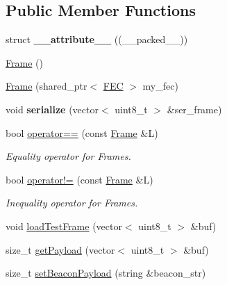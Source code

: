 \subsection*{Public Member Functions}
\begin{DoxyCompactItemize}
\item 
\mbox{\label{classFrame_a1c9286c3bbd1c0393baefa0ee4120a04}} 
struct {\bfseries \+\_\+\+\_\+attribute\+\_\+\+\_\+} ((\+\_\+\+\_\+packed\+\_\+\+\_\+))
\item 
\hyperlink{classFrame_ad2e5946cf41d4817e750500acf05d02b}{Frame} ()
\item 
\hyperlink{classFrame_a230b093686859a8d614b81b19f0433a0}{Frame} (shared\+\_\+ptr$<$ \hyperlink{classFEC}{F\+EC} $>$ my\+\_\+fec)
\item 
\mbox{\label{classFrame_abc897b6f22eabc8d4b2f12821bce1649}} 
void {\bfseries serialize} (vector$<$ uint8\+\_\+t $>$ \&ser\+\_\+frame)
\item 
\mbox{\label{classFrame_a40746b6fa955619e185573c1d38022dd}} 
bool \hyperlink{classFrame_a40746b6fa955619e185573c1d38022dd}{operator==} (const \hyperlink{classFrame}{Frame} \&L)
\begin{DoxyCompactList}\small\item\em Equality operator for Frames. \end{DoxyCompactList}\item 
\mbox{\label{classFrame_a604c4dc3f60c7bf4e861243f05ace9b8}} 
bool \hyperlink{classFrame_a604c4dc3f60c7bf4e861243f05ace9b8}{operator!=} (const \hyperlink{classFrame}{Frame} \&L)
\begin{DoxyCompactList}\small\item\em Inequality operator for Frames. \end{DoxyCompactList}\item 
void \hyperlink{classFrame_ae0082da89627bc112701735227104eec}{load\+Test\+Frame} (vector$<$ uint8\+\_\+t $>$ \&buf)
\item 
size\+\_\+t \hyperlink{classFrame_a57812c04330da0044155af6e2ca9a6a7}{get\+Payload} (vector$<$ uint8\+\_\+t $>$ \&buf)
\item 
size\+\_\+t \hyperlink{classFrame_a950b26a59c2f2716662a09964e5d95d1}{set\+Beacon\+Payload} (string \&beacon\+\_\+str)
\item 
\mbox{\label{classFrame_ad72ae3be73f6ef1ac0db92014f7eda7f}} 

\end{DoxyCompactItemize}
